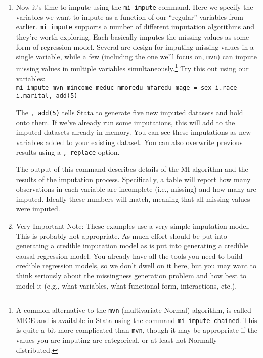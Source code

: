 \documentclass[a4paper,12pt]{article}
\begin{document}
\begin{enumerate}
\item Now it's time to impute using the \texttt{mi impute} command. Here we specify the variables we want to impute as a function of our ``regular'' variables from earlier. \texttt{mi impute} supports a number of different imputation algorithms and they're worth exploring. Each basically imputes the missing values as some form of regression model. Several are design for imputing missing values in a single variable, while a few (including the one we'll focus on, \texttt{mvn}) can impute missing values in multiple variables simultaneously.\footnote{A common alternative to the \texttt{mvn} (multivariate Normal) algorithm, is called MICE and is available in Stata using the command \texttt{mi impute chained}. This is quite a bit more complicated than \texttt{mvn}, though it may be appropriate if the values you are imputing are categorical, or at least not Normally distributed.} Try this out using our variables:\\
\texttt{mi impute mvn mincome meduc mmoredu mfaredu mage = sex i.race i.marital, add(5)}

The \texttt{, add(5)} tells Stata to generate five new imputed datasets and hold onto them. If we've already run some imputations, this will add to the imputed datasets already in memory. You can see these imputations as new variables added to your existing dataset. You can also overwrite previous results using a \texttt{, replace} option.

The output of this command describes details of the MI algorithm and the results of the imputation process. Specifically, a table will report how many observations in each variable are incomplete (i.e., missing) and how many are imputed. Ideally these numbers will match, meaning that all missing values were imputed.

\item Very Important Note: These examples use a very simple imputation model. This is probably not appropriate. As much effort should be put into generating a credible imputation model as is put into generating a credible causal regression model. You already have all the tools you need to build credible regression models, so we don't dwell on it here, but you may want to think seriously about the missingness generation problem and how best to model it (e.g., what variables, what functional form, interactions, etc.).


\end{enumerate}
\end{document}

